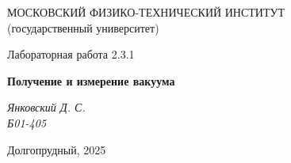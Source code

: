\thispagestyle{empty}

\begin{center}
    МОСКОВСКИЙ ФИЗИКО-ТЕХНИЧЕСКИЙ ИНСТИТУТ \\
    (государственный университет)
\end{center}

\vfill

\begin{center}
    Лабораторная работа 2.3.1 \\ 
    \vspace{20pt}
    
    \textbf{Получение и измерение вакуума} \\
\end{center}  

\begin{center}
    \textit{Янковский Д. С.} \\
    \textit{Б01-405} \\
\end{center}  

\vfill

\begin{center}
    Долгопрудный, 2025
\end{center}